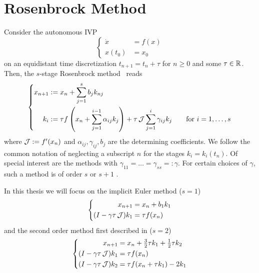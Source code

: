 \chapter{Rosenbrock Method}

Consider the autonomous \ac{IVP}
\begin{equation}
\left\{
\begin{aligned}
  \dot x &= f(x) \\
  x(t_0) &= x_0
\end{aligned}
\right.
\end{equation}
on an equidistant time discretization $t_{n+1} = t_n + \tau$ for $n\geq 0$ and some $\tau\in\mathbb{R}$.
Then, the $s$-stage Rosenbrock method~\cite{HairerWanner2} reads
\begin{equation}
\left\{
\begin{aligned}
  x_{n+1} &:= x_n + \sum_{j=1}^s b_j k_{nj}
  \\
  k_i &:= \tau f\left( x_n + \sum_{j=1}^{i-1} \alpha_{ij} k_j \right) + \tau \operatorname{\mathcal J} \sum_{j=1}^i \gamma_{ij} k_j
  \qquad
  \text{for } i = 1, \ldots, s
\end{aligned}
\right.
\end{equation}
where $\operatorname{\mathcal J} := f'(x_n)$ and $\alpha_{ij}, \gamma_{ij}, b_j$ are the determining coefficients.
We follow the common notation of neglecting a subscript $n$ for the stages $k_i=k_i(t_n)$.
Of special interest are the methods with $\gamma_{11} = \ldots = \gamma_{ss} =: \gamma$.
For certain choices of $\gamma$, such a method is of order $s$ or $s+1$ \cite{MPIMD11-06,HairerWanner2}.

In this thesis we will focus on the implicit Euler method ($s=1$)
\begin{equation}
\left\{
\begin{aligned}
  x_{n+1} &= x_n + b_1 k_1 \\
  (I - \gamma\tau \operatorname{\mathcal J}) k_1 &= \tau f(x_n)
\end{aligned}
\right.
\end{equation}
and the second order method first described in \cite{Verwer1999} ($s=2$)
\begin{equation}
\left\{
\begin{aligned}
  x_{n+1} &= x_n + \tfrac{3}{2} \tau k_1 + \tfrac{1}{2} \tau k_2 \\
  (I - \gamma\tau \operatorname{\mathcal J}) k_1 &= \tau f(x_n) \\
  (I - \gamma\tau \operatorname{\mathcal J}) k_2 &= \tau f(x_n + \tau k_1) - 2k_1
\end{aligned}
\right.
\end{equation}


